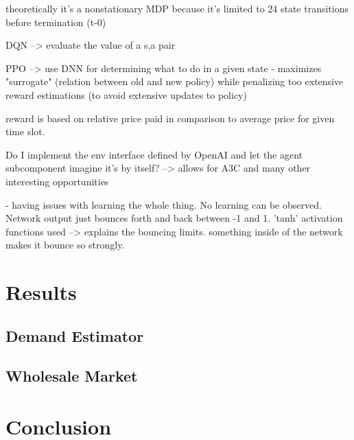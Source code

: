 theoretically it's a nonstationary \ac {MDP} because it's limited to 24 state transitions before termination (t-0)

DQN --> evaluate the value of a s,a pair

\ac {PPO} --> use DNN for determining what to do in a given state - maximizes "surrogate" (relation between old and new
policy) while penalizing too extensive reward estimations (to avoid extensive updates to policy)

reward is based on relative price paid in comparison to average price for given time slot.

Do I implement the env interface defined by OpenAI and let the agent subcomponent imagine it's by itself? --> allows for
A3C and many other interesting opportunities

- having issues with learning the whole thing. No learning can be observed. Network output just bounces forth and back
between -1 and 1. 'tanh' activation functions used --> explains the bouncing limits. something inside of the network
makes it bounce so strongly. 

\chapter{Results}

\section{Demand Estimator}%
\label{sec:demand_estimator}

\section{Wholesale Market}%
\label{sec:wholesale_market}

\chapter{Conclusion}%
\label{cha:conclusion}

